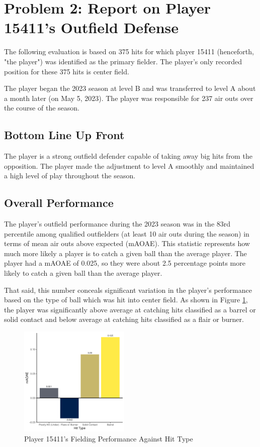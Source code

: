 
\section*{Problem 2: Report on Player 15411's Outfield Defense}
\label{sec:expts}

The following evaluation is based on 375 hits for which player 15411 (henceforth, "the player") was identified as the primary fielder. The player's only recorded position for these 375 hits is center field.

The player began the 2023 season at level B and was transferred to level A about a month later (on May 5, 2023). The player was responsible for 237 air outs over the course of the season.

\subsection{Bottom Line Up Front}

The player is a strong outfield defender capable of taking away big hits from the opposition. The player made the adjustment to level A smoothly and maintained a high level of play throughout the season.

\subsection{Overall Performance}
\label{sec:overallperformance}

The player's outfield performance during the 2023 season was in the 83rd percentile among qualified outfielders (at least 10 air outs during the season) in terms of mean air outs above expected (mAOAE). This statistic represents how much more likely a player is to catch a given ball than the average player. The player had a mAOAE of 0.025, so they were about 2.5 percentage points more likely to catch a given ball than the average player.

That said, this number conceals significant variation in the player's performance based on the type of ball which was hit into center field. As shown in Figure \ref{fig:hittype}, the player was significantly above average at catching hits classified as a barrel or solid contact and below average at catching hits classified as a flair or burner.

\begin{figure}[htb]
    \includegraphics[width = 0.47\textwidth]{../../output/figs/hit_type_15411.png}
    \caption{Player 15411's Fielding Performance Against Hit Type}
    \label{fig:hittype}
\end{figure}

